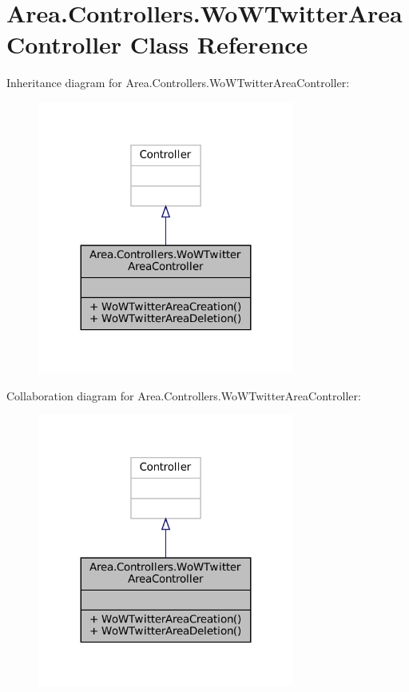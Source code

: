 \hypertarget{classArea_1_1Controllers_1_1WoWTwitterAreaController}{}\section{Area.\+Controllers.\+Wo\+W\+Twitter\+Area\+Controller Class Reference}
\label{classArea_1_1Controllers_1_1WoWTwitterAreaController}


Inheritance diagram for Area.\+Controllers.\+Wo\+W\+Twitter\+Area\+Controller\+:
\nopagebreak
\begin{figure}[H]
\begin{center}
\leavevmode
\includegraphics[width=239pt]{classArea_1_1Controllers_1_1WoWTwitterAreaController__inherit__graph}
\end{center}
\end{figure}


Collaboration diagram for Area.\+Controllers.\+Wo\+W\+Twitter\+Area\+Controller\+:
\nopagebreak
\begin{figure}[H]
\begin{center}
\leavevmode
\includegraphics[width=239pt]{classArea_1_1Controllers_1_1WoWTwitterAreaController__coll__graph}
\end{center}
\end{figure}
